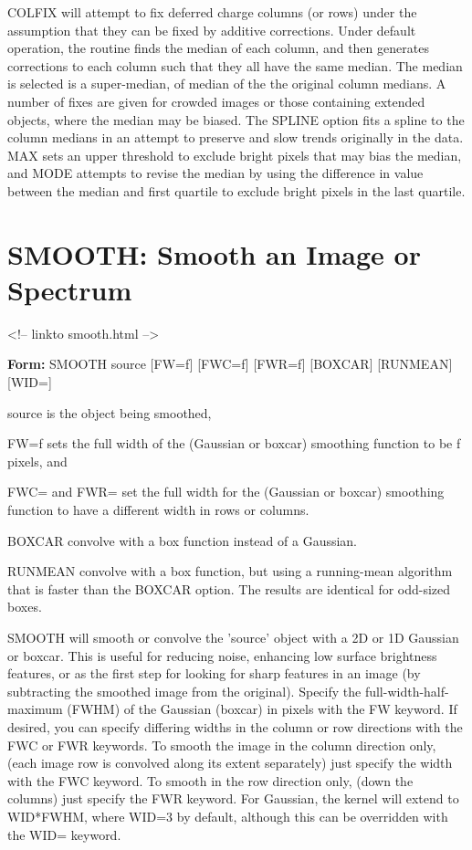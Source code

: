COLFIX will attempt to fix deferred charge columns (or rows) under
the assumption that they can be fixed by additive corrections.  Under
default operation, the routine finds the median of each column, and then
generates corrections to each column such that they all have the same
median.  The median is selected is a super-median, of median of the the
original column medians.  A number of fixes are given for crowded images or
those containing extended objects, where the median may be biased.  The
SPLINE option fits a spline to the column medians in an attempt to preserve
and slow trends originally in the data.  MAX sets an upper threshold to
exclude bright pixels that may bias the median, and MODE attempts to revise
the median by using the difference in value between the median and first
quartile to exclude bright pixels in the last quartile.

\section{SMOOTH: Smooth an Image or Spectrum}
\begin{rawhtml}
<!-- linkto smooth.html -->
\end{rawhtml}

\begin{command}
  \item[\textbf{Form: }SMOOTH source {[FW=f]} {[FWC=f]} {[FWR=f]} 
       {[BOXCAR]} {[RUNMEAN]} {[WID=]}\hfill]{}
  \item[source]{is the object being smoothed,}
  \item[FW=f]{sets the full width of the (Gaussian or boxcar)
       smoothing function to be f pixels, and}
  \item[FWC= and FWR=]{set the full width for the (Gaussian or boxcar)
       smoothing function to have a different width in rows or columns.}
  \item[BOXCAR]{convolve with a box function instead of a Gaussian.}
  \item[RUNMEAN]{convolve with a box function, but using a
       running-mean algorithm that is faster than the BOXCAR option. 
       The results are identical for odd-sized boxes.}
\end{command}

SMOOTH will smooth or convolve the 'source' object with a 2D or 1D Gaussian
or boxcar.  This is useful for reducing noise, enhancing low surface
brightness features, or as the first step for looking for sharp features in
an image (by subtracting the smoothed image from the original).  Specify the
full-width-half-maximum (FWHM) of the Gaussian (boxcar) in pixels with the
FW keyword. If desired, you can specify differing widths in the column or
row directions with the FWC or FWR keywords.  To smooth the image in the
column direction only, (each image row is convolved along its extent
separately) just specify the width with the FWC keyword.  To smooth in the
row direction only, (down the columns) just specify the FWR keyword. For
Gaussian, the kernel will extend to WID*FWHM, where WID=3 by default,
although this can be overridden with the WID= keyword.

